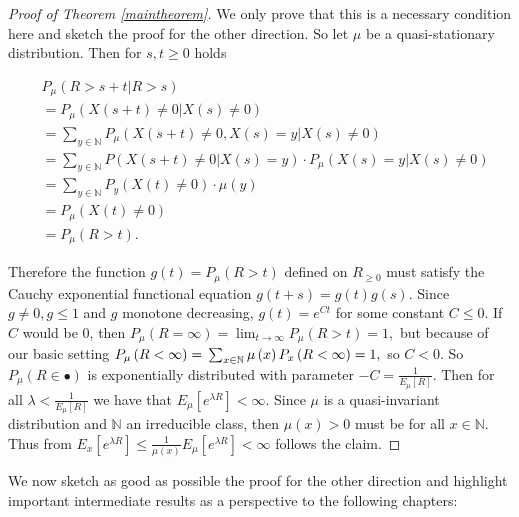 \documentclass[12pt,a4paper]{scrartcl}
\numberwithin{equation}{section}
\newcommand{\N}{\mathbb{N}} %
\begin{document}
\begin{proof} [Proof of Theorem \ref{maintheorem}]
We only prove that this is a necessary condition here and sketch the proof for the other direction.
So let $ \mu $ be a quasi-stationary distribution. Then for $ s,t \geq 0 $ holds

\begin{align*}
& P_{\mu}\left(R > s+t | R > s \right) \\
&= P_{\mu}\left(X\left(s+t\right) \neq 0 | X\left(s\right) \neq 0 \right) \\
&= \sum_{y \in \N} P_{\mu}\left(X\left(s+t\right) \neq 0 , X\left(s\right) = y | X\left(s\right) \neq 0 \right) \\
&= \sum_{y \in \N} P\left(X\left(s+t\right) \neq 0 | X\left(s\right) = y\right) \cdot P_{\mu}\left(X\left(s\right) = y | X\left(s\right) \neq 0 \right) \\
&=\sum_{y \in \N} P_y \left(X\left(t\right) \neq 0 \right) \cdot \mu\left(y\right) \\
&= P_{\mu} \left(X\left(t\right) \neq 0 \right) \\
&= P_{\mu} \left(R > t\right).
\end{align*}

Therefore the function $g\left(t\right) = P_{\mu}\left(R > t\right)$ defined on $R_{\geq 0}$ must satisfy the Cauchy exponential functional equation $g\left(t+s\right) = g\left(t\right) g\left(s\right).$ Since $g \neq 0, g \leq 1$ and $g$ monotone decreasing, $g\left(t\right) = e^{Ct}$ for some constant $C \leq 0$. If $C$ would be $0$, then $P_{\mu}\left(R = \infty\right) = \lim_{t \to \infty} P_{\mu}\left(R > t\right) = 1,$ but because of our basic setting $P_{\mu}\left(R < \infty\right) = \\ \sum_{x \in \N}\mu\left(x\right) P_x\left(R < \infty\right) = 1,$ so $ C < 0.$
So $P_{\mu}\left(R \in \bullet\right)$ is exponentially distributed with parameter $-C = \frac{1}{E_{\mu} \left[R\right]}$. Then for all $ \lambda < \frac{1}{E_{\mu} \left[R\right]} $ we have that $ E_{\mu} \left[e^{\lambda R}\right] < \infty$. Since $\mu$ is a quasi-invariant distribution and $\N$ an irreducible class, then $ \mu\left(x\right) > 0 $ must be for all $ x \in \N$. Thus from $E_{x} \left[e^{\lambda R}\right] \leq \frac{1}{\mu\left(x\right)} E_{\mu} \left[e^{\lambda R}\right] < \infty $ follows the claim.

\end{proof}

We now sketch as good as possible the proof for the other direction and highlight important intermediate results as a perspective to the following chapters:
\end{document}
